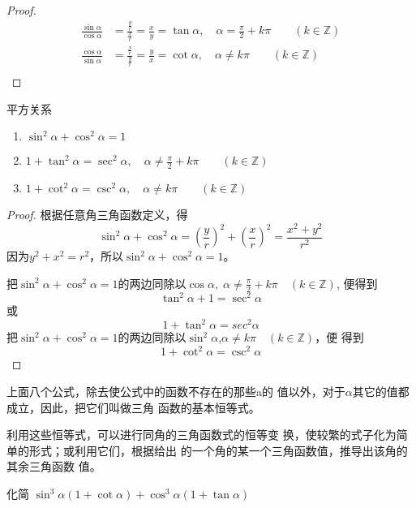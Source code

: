\begin{proof}
\[\begin{split}
    \frac{\sin\alpha}{\cos\alpha}&=\frac{\frac{y}{r}}{\frac{x}{r}}=\frac{x}{y}=\tan\alpha,\quad \alpha=\frac{\pi}{2}+k\pi\qquad (k\in\mathbb{Z})\\
    \frac{\cos\alpha}{\sin\alpha}&=\frac{\frac{x}{r}}{\frac{y}{r}}=\frac{y}{x}=\cot\alpha,\quad \alpha\ne k\pi\qquad (k\in\mathbb{Z})\\
\end{split}\]    
\end{proof}


\begin{blk}{平方关系}
\begin{enumerate}
    \item $\sin^2\alpha+\cos^2\alpha=1$
    \item $1+\tan^2\alpha=\sec^2\alpha,\quad \alpha\ne \frac{\pi}{2}+k\pi\qquad  (k\in\mathbb{Z})$
    \item $1+\cot^2\alpha=\csc^2\alpha,\quad \alpha\ne k\pi \qquad (k\in\mathbb{Z})$
\end{enumerate}
\end{blk}

\begin{proof}
    根据任意角三角函数定义，得
\[\sin^2\alpha+\cos^2\alpha=\left(\frac{y}{r}\right)^2+\left(\frac{x}{r}\right)^2=\frac{x^2+y^2}{r^2}\]
因为$y^2+x^2=r^2$，所以$\sin^2\alpha+\cos^2\alpha=1$。

把$\sin^2\alpha+\cos^2\alpha=1$的两边同除以$\cos\alpha,\; \alpha\ne\frac{\pi}{2}+k\pi\quad (k\in\mathbb{Z})$, 便得到
\[\tan^2\alpha+1=\sec^2\alpha\]
或
\[1+\tan^2\alpha=sec^2\alpha\]
把$\sin^2\alpha+\cos^2\alpha=1$的两边同除以$\sin^2\alpha$,$\alpha\ne k\pi\quad (k\in\mathbb{Z})$，便
得到
\[1+\cot^2\alpha =\csc^2\alpha\]
\end{proof}


上面八个公式，除去使公式中的函数不存在的那些a的
值以外，对于$\alpha$其它的值都成立，因此，把它们叫做三角
函数的基本恒等式。

利用这些恒等式，可以进行同角的三角函数式的恒等变
换，使较繁的式子化为简单的形式；或利用它们，根据给出
的一个角的某一个三角函数值，推导出该角的其余三角函数
值。




\begin{example}
    化简 $\sin ^{3} \alpha(1+\cot \alpha)+\cos ^{3} \alpha(1+\tan \alpha)$
\end{example}

